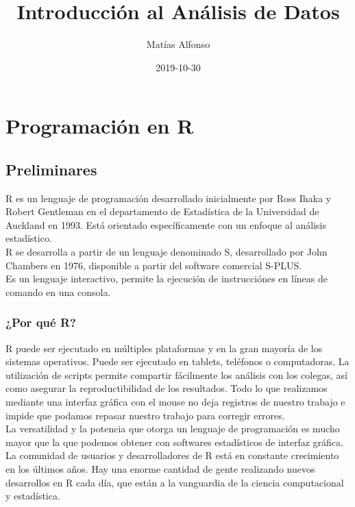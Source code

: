 \documentclass[spanish,]{book}
\title{Introducción al Análisis de Datos}
\author{Matías Alfonso}
\date{2019-10-30}
\begin{document}
\maketitle

{
\setcounter{tocdepth}{1}
\tableofcontents
}
\part{Programación en R}\label{part-programacion-en-r}

\chapter{Preliminares}\label{prelim}

R es un lenguaje de programación desarrollado inicialmente por Ross
Ihaka y Robert Gentleman en el departamento de Estadística de la
Universidad de Auckland en 1993. Está orientado específicamente con un
enfoque al análisis estadístico.\\
R se desarrolla a partir de un lenguaje denominado S, desarrollado por
John Chambers en 1976, disponible a partir del software comercial
S-PLUS.\\
Es un lenguaje interactivo, permite la ejecución de instrucciónes en
líneas de comando en una consola.

\section{¿Por qué R?}\label{por-que-r}

R puede ser ejecutado en múltiples plataformas y en la gran mayoría de
los sistemas operativos. Puede ser ejecutado en tablets, teléfonos o
computadoras. La utilización de scripts permite compartir fácilmente los
análisis con los colegas, así como asegurar la reproductibilidad de los
resultados. Todo lo que realizamos mediante una interfaz gráfica con el
mouse no deja registros de nuestro trabajo e impide que podamos repasar
nuestro trabajo para corregir errores.\\
La versatilidad y la potencia que otorga un lenguaje de programación es
mucho mayor que la que podemos obtener con softwares estadísticos de
interfaz gráfica.\\
La comunidad de usuarios y desarrolladores de R está en constante
crecimiento en los últimos años. Hay una enorme cantidad de gente
realizando nuevos desarrollos en R cada día, que están a la vanguardia
de la ciencia computacional y estadística.
\end{document}
